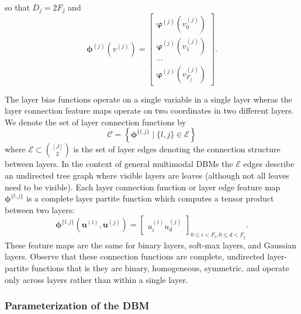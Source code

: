 \documentclass{article} %
\begin{document}
so that $D_j=2F_j$ and
\begin{equation}
\boldsymbol{\phi}^{(j)}(v^{(j)}) = \begin{bmatrix} \boldsymbol{\varphi}^{(j)}(v^{(j)}_0) \\ \boldsymbol{\varphi}^{(j)}(v^{(j)}_1) \\ \cdots \\ \boldsymbol{\varphi}^{(j)}(v^{(j)}_{F_j}) \end{bmatrix}.
\end{equation}



The layer bias functions operate on a single variable in a single layer wheras the layer connection feature maps operate on two coordinates
in two different layers.  We denote the set of layer connection functions by
\begin{equation}
\mathcal{C} = \left\{ \boldsymbol{\phi}^{\{l,j\}} \mid \{l,j\} \in\mathcal{E}\right\}
\end{equation}
where $\mathcal{E}\subset { [J] \choose 2 }$ is the set of layer edges denoting the connection structure between layers.  In the
context of general multimodal DBMs the $\mathcal{E}$ edges describe an undirected tree graph where visible layers are leaves (although
not all leaves need to be visible).  Each layer connection function or layer edge feature map $\boldsymbol{\phi}^{\{l,j\}}$ is a complete
layer partite function which computes a tensor product between two layers:
\begin{equation}
\boldsymbol{\phi}^{\{l,j\}}(\mathbf{u}^{(l)},\mathbf{u}^{(j)}) = \begin{bmatrix} u^{(l)}_i u^{(j)}_d \end{bmatrix}_{0\leq i < F_l,0\leq d < F_j}.
\end{equation}
These feature maps are the same for binary layers, soft-max layers,
and Gaussian layers.  Observe that these
connection functions are complete, undirected layer-partite functions
that is they are binary, homogeneous, symmetric, and operate only
across layers rather than within a single layer.

\subsubsection{Parameterization of the DBM}
\end{document}
